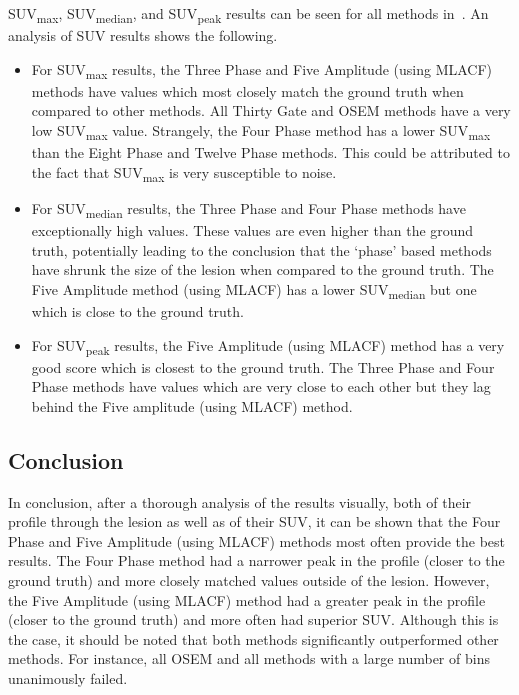             \gls{SUV}\textsubscript{max}, \gls{SUV}\textsubscript{median}, and \gls{SUV}\textsubscript{peak} results can be seen for all methods in~. An analysis of \gls{SUV} results shows the following.

            \begin{itemize}
                \item For \gls{SUV}\textsubscript{max} results, the Three Phase and Five Amplitude (using \gls{MLACF}) methods have values which most closely match the ground truth when compared to other methods. All Thirty Gate and \gls{OSEM} methods have a very low \gls{SUV}\textsubscript{max} value. Strangely, the Four Phase method has a lower \gls{SUV}\textsubscript{max} than the Eight Phase and Twelve Phase methods. This could be attributed to the fact that \gls{SUV}\textsubscript{max} is very susceptible to noise.

                \item For \gls{SUV}\textsubscript{median} results, the Three Phase and Four Phase methods have exceptionally high values. These values are even higher than the ground truth, potentially leading to the conclusion that the `phase' based methods have shrunk the size of the lesion when compared to the ground truth. The Five Amplitude method (using \gls{MLACF}) has a lower \gls{SUV}\textsubscript{median} but one which is close to the ground truth.

                \item For \gls{SUV}\textsubscript{peak} results, the Five Amplitude (using \gls{MLACF}) method has a very good score which is closest to the ground truth. The Three Phase and Four Phase methods have values which are very close to each other but they lag behind the Five amplitude (using \gls{MLACF}) method.
            \end{itemize}

        \subsection{Conclusion} \label{sec:evaluation_of_pet_ct_motion_correction_incorporating_motion_models_using_mlacf_and_complex_gating_schemes_conclusion}
            In conclusion, after a thorough analysis of the results visually, both of their profile through the lesion as well as of their \gls{SUV}, it can be shown that the Four Phase and Five Amplitude (using \gls{MLACF}) methods most often provide the best results. The Four Phase method had a narrower peak in the profile (closer to the ground truth) and more closely matched values outside of the lesion. However, the Five Amplitude (using \gls{MLACF}) method had a greater peak in the profile (closer to the ground truth) and more often had superior \gls{SUV}. Although this is the case, it should be noted that both methods significantly outperformed other methods. For instance, all \gls{OSEM} and all methods with a large number of bins unanimously failed.
            
